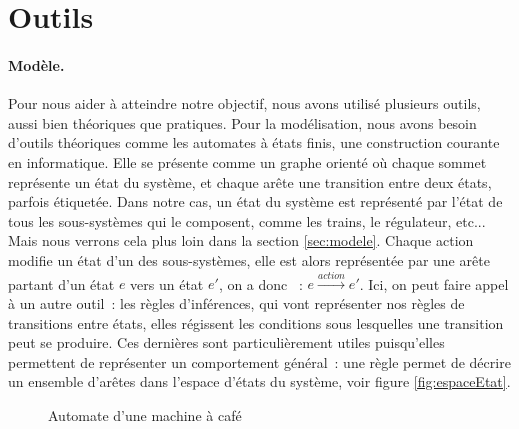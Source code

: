 \documentclass[oneside, a4paper, 11pt]{book}
\begin{document}
\section{Outils}




\paragraph{Modèle.}
Pour nous aider à atteindre notre objectif, nous avons utilisé plusieurs outils, aussi bien théoriques que pratiques.
Pour la modélisation, nous avons besoin d'outils théoriques comme les automates à états finis, une construction courante en informatique. Elle se présente comme un graphe orienté
où chaque sommet représente un état du système, et chaque arête une transition entre deux états, parfois étiquetée.
Dans notre cas, un état du système est représenté par l'état de tous les sous-systèmes qui le composent, comme les trains, le régulateur, etc... 
Mais nous verrons cela plus loin dans la section \ref{sec:modele}.
Chaque action modifie un état d'un des sous-systèmes, elle est alors représentée par une arête partant d'un état $e$ vers un état $e'$, on a donc ~: $e \xrightarrow{action} e'$.
Ici, on peut faire appel à un autre outil~: les règles d'inférences, qui vont représenter nos règles de transitions entre états, elles régissent les conditions sous lesquelles une transition peut se produire.
Ces dernières sont particulièrement utiles puisqu'elles permettent de représenter un comportement général~: une règle permet de décrire un ensemble d'arêtes dans l'espace d'états du système, voir figure \ref{fig:espaceEtat}.

\begin{figure}
	\centering
	\caption{Automate d'une machine à café}
	\label{fig:cafe}
\end{figure}
\end{document}

